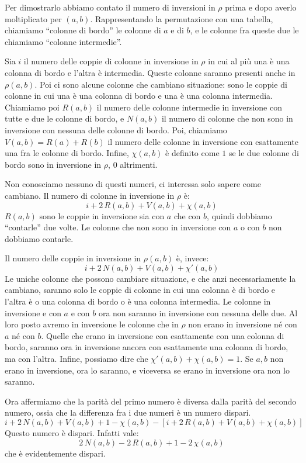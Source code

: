 Per dimostrarlo abbiamo contato il numero di inversioni in $\rho$ prima e dopo averlo moltiplicato per $(a,b)$.
Rappresentando la permutazione con una tabella, chiamiamo ``colonne di bordo'' le colonne di $a$ e di $b$, e le colonne fra queste due le chiamiamo ``colonne intermedie''.

Sia $i$ il numero delle coppie di colonne in inversione in $\rho$ in cui al pi\`u una \`e una colonna di bordo e l'altra \`e intermedia.
Queste colonne saranno presenti anche in $\rho (a,b)$.
Poi ci sono alcune colonne che cambiano situazione: sono le coppie di colonne in cui una \`e una colonna di bordo e una \`e una colonna intermedia.
Chiamiamo poi $R(a,b)$ il numero delle colonne intermedie in inversione con tutte e due le colonne di bordo, e $N(a,b)$ il numero di colonne che non sono in inversione con nessuna delle colonne di bordo.
Poi, chiamiamo $V(a,b) = R(a) + R(b)$ il numero delle colonne in inversione con esattamente una fra le colonne di bordo.
Infine, $\chi(a,b)$ \`e definito come $1$ se le due colonne di bordo sono in inversione in $\rho$, $0$ altrimenti.

Non conosciamo nessuno di questi numeri, ci interessa solo sapere come cambiano.
Il numero di colonne in inversione in $\rho$ \`e:
\[
i + 2 \, R(a,b) + V(a,b) + \chi(a,b)
\]
$R(a,b)$ sono le coppie in inversione sia con $a$ che con $b$, quindi dobbiamo ``contarle'' due volte.
Le colonne che non sono in inversione con $a$ o con $b$ non dobbiamo contarle.

Il numero delle coppie in inversione in $\rho (a,b)$ \`e, invece:
\[
i + 2 \, N(a,b) + V(a,b) + \chi'(a,b)
\]
Le uniche colonne che possono cambiare situazione, e che anzi necessariamente la cambiano, saranno solo le coppie di colonne in cui una colonna \`e di bordo e l'altra \`e o una colonna di bordo o \`e una colonna intermedia.
Le colonne in inversione e con $a$ e con $b$ ora non saranno in inversione con nessuna delle due.
Al loro posto avremo in inversione le colonne che in $\rho$ non erano in inversione n\'e con $a$ n\'e con $b$.
Quelle che erano in inversione con esattamente con una colonna di bordo, saranno ora in inversione ancora con esattamente una colonna di bordo, ma con l'altra.
Infine, possiamo dire che $\chi'(a,b) + \chi(a,b) = 1$.
Se $a,b$ non erano in inversione, ora lo saranno, e viceversa se erano in inversione ora non lo saranno. 

Ora affermiamo che la parit\`a del primo numero \`e diversa dalla parit\`a del secondo numero, ossia che la differenza fra i due numeri \`e un numero dispari.
\[
i + 2 \, N(a,b) + V(a,b) + 1 - \chi(a,b) - \left[ i + 2 \, R(a,b) + V(a,b) + \chi (a,b) \right]
\]
Questo numero \`e dispari.
Infatti vale:
\[
2 \, N(a,b) - 2 \, R(a,b) + 1 - 2 \, \chi(a,b)
\]
che \`e evidentemente dispari.

